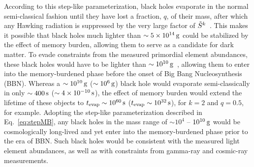 \documentclass[aps, prl, reprint, preprintnumbers, showpacs, floatfix, nofootinbib, superscriptaddress, %
nofootinbib]{revtex4-1}
\begin{document}
According to this step-like parameterization, black holes evaporate in the normal semi-classical fashion until they have lost a fraction, $q$, of their mass, after which any Hawking radiation is suppressed by the very large factor of $\Tilde{S}^{k}$~\cite{Dvali:2018xpy, Dvali:2018ytn, Dvali:2020wft}. This makes it possible that black holes much lighter than $\sim 5 \times 10^{14}\,{\rm g}$ could be stabilized by the effect of memory burden, allowing them to serve as a candidate for dark matter. To evade constraints from the measured primordial element abundances, these black holes would have to be lighter than $\sim 10^{10}\,{\rm g}$~\cite{Keith:2020jww,Haque:2024eyh}, allowing them to enter into the memory-burdened phase before the onset of Big Bang Nucleosynthesis (BBN). Whereas a $\sim 10^{10}\,{\rm g}$ ($\sim 10^{6}\,{\rm g}$) black hole would evaporate semi-classically in only $\sim 400\,{\rm s}$ ($\sim 4 \times 10^{-10}\,{\rm s}$), the effect of memory burden would extend the lifetime of these objects to $t_{\rm evap} \sim 10^{60}\,{\rm s}$ ($t_{\rm evap} \sim 10^{32}\,{\rm s}$), for $k=2$ and $q=0.5$, for example. Adopting the step-like parameterization described in Eq.~\eqref{eq:stepMB}, any black holes in the mass range of $\sim 10^{4}$ -- $10^{10}\,{\rm g}$ would be cosmologically long-lived and yet enter into the memory-burdened phase prior to the era of BBN. Such black holes would be consistent with the measured light element abundances, as well as with constraints from gamma-ray and cosmic-ray measurements.
\end{document}
